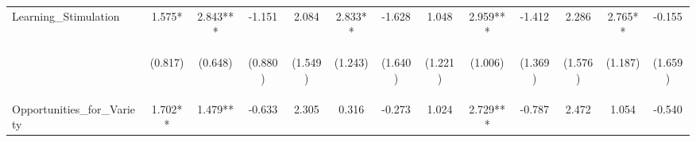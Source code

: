 \begin{tabular}{lcccccccccccc}
\noalign{\smallskip}Learning_Stimulation & 1.575* & 2.843*** & -1.151 & 2.084 & 2.833** & -1.628 & 1.048 & 2.959*** & -1.412 & 2.286 & 2.765** & -0.155\\
 & \begin{footnotesize}(0.817)\end{footnotesize} & \begin{footnotesize}(0.648)\end{footnotesize} & \begin{footnotesize}(0.880)\end{footnotesize} & \begin{footnotesize}(1.549)\end{footnotesize} & \begin{footnotesize}(1.243)\end{footnotesize} & \begin{footnotesize}(1.640)\end{footnotesize} & \begin{footnotesize}(1.221)\end{footnotesize} & \begin{footnotesize}(1.006)\end{footnotesize} & \begin{footnotesize}(1.369)\end{footnotesize} & \begin{footnotesize}(1.576)\end{footnotesize} & \begin{footnotesize}(1.187)\end{footnotesize} & \begin{footnotesize}(1.659)\end{footnotesize}\\
\noalign{\smallskip}Opportunities_for_Variety & 1.702** & 1.479** & -0.633 & 2.305 & 0.316 & -0.273 & 1.024 & 2.729*** & -0.787 & 2.472 & 1.054 & -0.540\\

\end{tabular}
